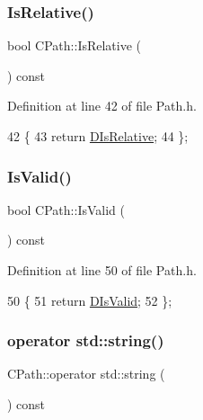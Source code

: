 \subsubsection{\texorpdfstring{Is\+Relative()}{IsRelative()}}
{\footnotesize\ttfamily bool C\+Path\+::\+Is\+Relative (\begin{DoxyParamCaption}{ }\end{DoxyParamCaption}) const\hspace{0.3cm}{\ttfamily [inline]}}



Definition at line 42 of file Path.\+h.


\begin{DoxyCode}
42                                \{
43             \textcolor{keywordflow}{return} \hyperlink{classCPath_af705ff149bb2281c67afb84fff550eb9}{DIsRelative};  
44         \};
\end{DoxyCode}
\hypertarget{classCPath_a248abbdeb912f48ba4100680540e2061}{}\label{classCPath_a248abbdeb912f48ba4100680540e2061} 
\subsubsection{\texorpdfstring{Is\+Valid()}{IsValid()}}
{\footnotesize\ttfamily bool C\+Path\+::\+Is\+Valid (\begin{DoxyParamCaption}{ }\end{DoxyParamCaption}) const\hspace{0.3cm}{\ttfamily [inline]}}



Definition at line 50 of file Path.\+h.


\begin{DoxyCode}
50                             \{
51             \textcolor{keywordflow}{return} \hyperlink{classCPath_a992aca27a1cba1c3bae3d04438821192}{DIsValid};  
52         \};
\end{DoxyCode}
\hypertarget{classCPath_a8fade0e7a418c92d5f68ac8872dda8b1}{}\label{classCPath_a8fade0e7a418c92d5f68ac8872dda8b1} 
\subsubsection{\texorpdfstring{operator std\+::string()}{operator std::string()}}
{\footnotesize\ttfamily C\+Path\+::operator std\+::string (\begin{DoxyParamCaption}{ }\end{DoxyParamCaption}) const}



